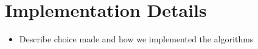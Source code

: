 
\section{Implementation Details}

\begin{itemize}
    \item Describe choice made and how we implemented the algorithms
\end{itemize}